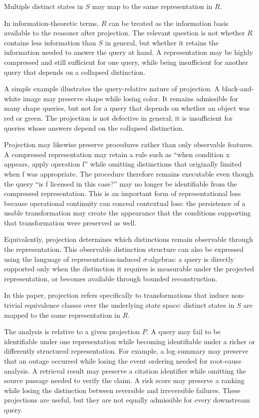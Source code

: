 \documentclass[11pt]{article}
\theoremstyle{definition}
\theoremstyle{remark}
\begin{document}
Multiple distinct states in $S$ may map to the same representation in $R$.

In information-theoretic terms, $R$ can be treated as the information basis available to the reasoner after projection. The relevant question is not whether $R$ contains less information than $S$ in general, but whether it retains the information needed to answer the query at hand. A representation may be highly compressed and still sufficient for one query, while being insufficient for another query that depends on a collapsed distinction.

A simple example illustrates the query-relative nature of projection. A black-and-white image may preserve shape while losing color. It remains admissible for many shape queries, but not for a query that depends on whether an object was red or green. The projection is not defective in general; it is insufficient for queries whose answers depend on the collapsed distinction.

Projection may likewise preserve procedures rather than only observable features. A compressed representation may retain a rule such as “when condition x appears, apply operation f” while omitting distinctions that originally limited when f was appropriate. The procedure therefore remains executable even though the query “is f licensed in this case?” may no longer be identifiable from the compressed representation. This is an important form of representational loss because operational continuity can conceal contextual loss: the persistence of a usable transformation may create the appearance that the conditions supporting that transformation were preserved as well.

Equivalently, projection determines which distinctions remain observable through the representation. This observable distinction structure can also be expressed using the language of representation-induced \(\sigma\)-algebras: a query is directly supported only when the distinction it requires is measurable under the projected representation, or becomes available through bounded reconstruction.

In this paper, projection refers specifically to transformations that induce non-trivial equivalence classes over the underlying state space: distinct states in $S$ are mapped to the same representation in $R$.

The analysis is relative to a given projection $P$. A query may fail to be identifiable under one representation while becoming identifiable under a richer or differently structured representation. For example, a log summary may preserve that an outage occurred while losing the event ordering needed for root-cause analysis. A retrieval result may preserve a citation identifier while omitting the source passage needed to verify the claim. A risk score may preserve a ranking while losing the distinction between reversible and irreversible failures. These projections are useful, but they are not equally admissible for every downstream query.
\end{document}
